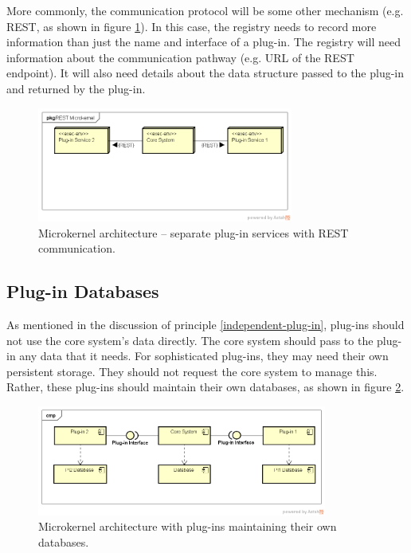 More commonly, the communication protocol will be some other mechanism (e.g. REST, as shown in figure \ref{fig:rest-microkernel}).
In this case, the registry needs to record more information than just the name and interface of a plug-in.
The registry will need information about the communication pathway (e.g. URL of the REST endpoint).
It will also need details about the data structure passed to the plug-in and returned by the plug-in.

\begin{figure}[h!]
    \centering
    \includegraphics[trim=38 168 19 45,clip,width=0.75\textwidth]{diagrams/rest-microkernel.png}
    \caption{Microkernel architecture -- separate plug-in services with REST communication.}
    \label{fig:rest-microkernel}
\end{figure}

\subsection{Plug-in Databases}

As mentioned in the discussion of principle \ref{independent-plug-in}, plug-ins should not use the core system's data directly.
The core system should pass to the plug-in any data that it needs.
For sophisticated plug-ins, they may need their own persistent storage.
They should not request the core system to manage this.
Rather, these plug-ins should maintain their own databases, as shown in figure \ref{fig:plug-in-dbs}.

\begin{figure}[h!]
    \centering
    \includegraphics[trim=39 81 24 50,clip,width=0.85\textwidth]{diagrams/plug-in-databases.png}
    \caption{Microkernel architecture with plug-ins maintaining their own databases.}
    \label{fig:plug-in-dbs}
\end{figure}

